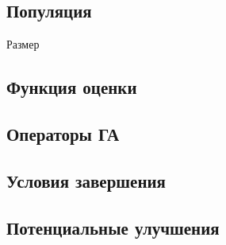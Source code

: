\subsection*{Популяция}
Размер 

\subsection*{Функция оценки}

\subsection*{Операторы ГА}

\subsection*{Условия завершения}

\subsection*{Потенциальные улучшения}


